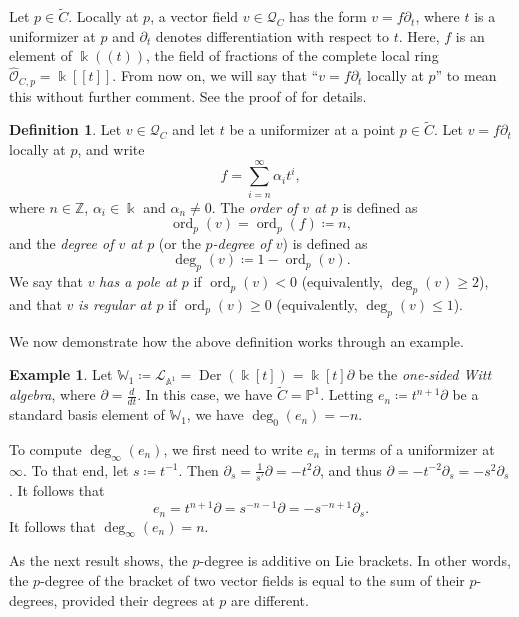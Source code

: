 \documentclass[12pt]{amsart}
\theoremstyle{plain}
\theoremstyle{definition}
\newtheorem{definition}[theorem]{Definition}
\newtheorem{example}[theorem]{Example}
\numberwithin{equation}{section}
\def\L{\mathcal{L}}
\def\O{\mathcal{O}}
\def\Q{\mathcal{Q}}
\def\ZZ{\mathbb{Z}}
\def\Aa{\mathbb{A}}
\def\PP{\mathbb{P}}
\def\WW{\mathbb{W}}
\def\kk{\Bbbk}
\DeclareMathOperator{\Der}{Der}
\DeclareMathOperator{\ord}{ord}
\def\del{\partial}
\newcommand{\diff}[1]{\frac{d}{d#1}}
\begin{document}
Let $p \in \widetilde{C}$. Locally at $p$, a vector field $v \in \Q_C$ has the form $v = f\del_t$, where $t$ is a uniformizer at $p$ and $\del_t$ denotes differentiation with respect to $t$. Here, $f$ is an element of $\kk((t))$, the field of fractions of the complete local ring $\widehat{\O}_{C,p} = \kk[[t]]$. From now on, we will say that ``$v = f\del_t$ locally at $p$'' to mean this without further comment. See the proof of \cite[Lemma 3.12]{Buzaglo} for details.

\begin{definition}
    Let $v \in \Q_C$ and let $t$ be a uniformizer at a point $p \in \widetilde{C}$. Let $v = f\del_t$ locally at $p$, and write
    $$f = \sum_{i = n}^\infty \alpha_i t^i,$$
    where $n \in \ZZ$, $\alpha_i \in \kk$ and $\alpha_n \neq 0$. The \emph{order of $v$ at $p$} is defined as
    $$\ord_p(v) = \ord_p(f) \coloneqq n,$$
    and the \emph{degree of $v$ at $p$} (or the \emph{$p$-degree of $v$}) is defined as
    $$\deg_p(v) \coloneqq 1 - \ord_p(v).$$
    We say that $v$ \emph{has a pole at $p$} if $\ord_p(v) < 0$ (equivalently, $\deg_p(v) \geq 2$), and that $v$ \emph{is regular at $p$} if $\ord_p(v) \geq 0$ (equivalently, $\deg_p(v) \leq 1$).
\end{definition}

We now demonstrate how the above definition works through an example.

\begin{example}
    Let $\WW_1 \coloneqq \L_{\Aa^1} = \Der(\kk[t]) = \kk[t]\del$ be the \emph{one-sided Witt algebra}, where $\del = \diff{t}$. In this case, we have $\widetilde{C} = \PP^1$. Letting $e_n \coloneqq t^{n + 1}\del$ be a standard basis element of $\WW_1$, we have $\deg_0(e_n) = -n$.
    
    To compute $\deg_\infty(e_n)$, we first need to write $e_n$ in terms of a uniformizer at $\infty$. To that end, let $s \coloneqq t^{-1}$. Then $\del_s = \frac{1}{s'}\del = -t^2\del$, and thus $\del = -t^{-2}\del_s = -s^2\del_s$. It follows that
    $$e_n = t^{n + 1}\del = s^{-n - 1}\del = -s^{-n + 1}\del_s.$$
    It follows that $\deg_\infty(e_n) = n$.
\end{example}

As the next result shows, the $p$-degree is additive on Lie brackets. In other words, the $p$-degree of the bracket of two vector fields is equal to the sum of their $p$-degrees, provided their degrees at $p$ are different.
\end{document}
